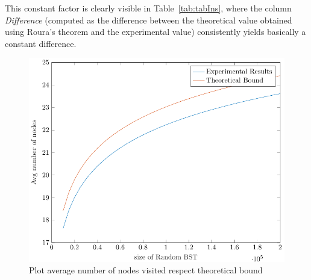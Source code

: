 This constant factor is clearly visible in Table~\ref{tab:tabIns}, where the column \textit{Difference} (computed as the difference between the theoretical value obtained using Roura's theorem and the experimental value) consistently yields basically a constant difference.

\begin{figure}
    \centering
    \includegraphics[scale=0.65]{plotInsertion.pdf}
    \caption{Plot average number of nodes visited respect theoretical bound}
    \label{fig:plotBoundIns}
\end{figure}


